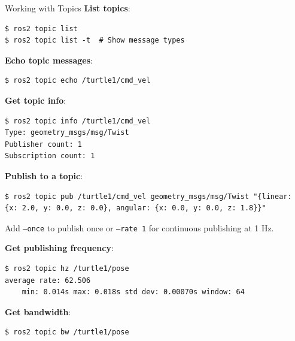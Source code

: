 \begin{frame}{Working with Topics}
    \textbf{List topics}:
    \begin{lstlisting}[language=shell]
$ ros2 topic list
$ ros2 topic list -t  # Show message types
\end{lstlisting}

    \textbf{Echo topic messages}:
    \begin{lstlisting}[language=shell]
$ ros2 topic echo /turtle1/cmd_vel
\end{lstlisting}

    \textbf{Get topic info}:
    \begin{lstlisting}[language=shell]
$ ros2 topic info /turtle1/cmd_vel
Type: geometry_msgs/msg/Twist
Publisher count: 1
Subscription count: 1
\end{lstlisting}

    \framebreak

    \textbf{Publish to a topic}:
    \begin{lstlisting}[language=shell]
$ ros2 topic pub /turtle1/cmd_vel geometry_msgs/msg/Twist "{linear: {x: 2.0, y: 0.0, z: 0.0}, angular: {x: 0.0, y: 0.0, z: 1.8}}"
\end{lstlisting}

    Add \texttt{--once} to publish once or \texttt{--rate 1} for continuous publishing at 1 Hz.

    \textbf{Get publishing frequency}:
    \begin{lstlisting}[language=shell]
$ ros2 topic hz /turtle1/pose
average rate: 62.506
	min: 0.014s max: 0.018s std dev: 0.00070s window: 64
\end{lstlisting}

    \textbf{Get bandwidth}:
    \begin{lstlisting}[language=shell]
$ ros2 topic bw /turtle1/pose
\end{lstlisting}
\end{frame}

